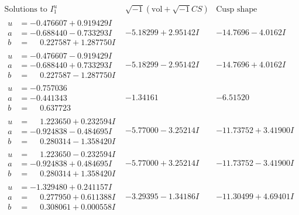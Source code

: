 \documentclass[1p]{elsarticle_modified}
\theoremstyle{definition}
\newcommand{\I}{\sqrt{-1}}
\begin{document}
$$\begin{array}{c|c|c}  
\text{Solutions to }I^u_{1}& \I (\text{vol} + \sqrt{-1}CS) & \text{Cusp shape}\\
 \hline 
\begin{aligned}
u &= -0.476607 + 0.919429 I \\
a &= -0.688440 - 0.733293 I \\
b &= \phantom{-}0.227587 + 1.287750 I\end{aligned}
 & -5.18299 + 2.95142 I & -14.7696 - 4.0162 I \\ \hline\begin{aligned}
u &= -0.476607 - 0.919429 I \\
a &= -0.688440 + 0.733293 I \\
b &= \phantom{-}0.227587 - 1.287750 I\end{aligned}
 & -5.18299 - 2.95142 I & -14.7696 + 4.0162 I \\ \hline\begin{aligned}
u &= -0.757036\phantom{ +0.000000I} \\
a &= -0.441343\phantom{ +0.000000I} \\
b &= \phantom{-}0.637723\phantom{ +0.000000I}\end{aligned}
 & -1.34161\phantom{ +0.000000I} & -6.51520\phantom{ +0.000000I} \\ \hline\begin{aligned}
u &= \phantom{-}1.223650 + 0.232594 I \\
a &= -0.924838 - 0.484695 I \\
b &= \phantom{-}0.280314 - 1.358420 I\end{aligned}
 & -5.77000 - 3.25214 I & -11.73752 + 3.41900 I \\ \hline\begin{aligned}
u &= \phantom{-}1.223650 - 0.232594 I \\
a &= -0.924838 + 0.484695 I \\
b &= \phantom{-}0.280314 + 1.358420 I\end{aligned}
 & -5.77000 + 3.25214 I & -11.73752 - 3.41900 I \\ \hline\begin{aligned}
u &= -1.329480 + 0.241157 I \\
a &= \phantom{-}0.277950 + 0.611388 I \\
b &= \phantom{-}0.308061 + 0.000558 I\end{aligned}
 & -3.29395 - 1.34186 I & -11.30499 + 4.69401 I \\ \hline\begin{aligned}

\end{aligned}
\end{array}$$
\end{document}
